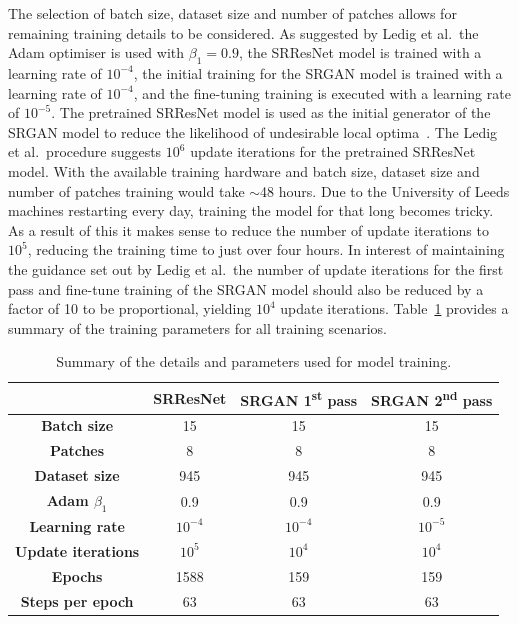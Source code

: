 The selection of batch size, dataset size and number of patches allows for remaining training details to be considered. As suggested by Ledig et al.\ the Adam optimiser is used with $\beta_1 = 0.9$, the SRResNet model is trained with a learning rate of $10^{-4}$, the initial training for the SRGAN model is trained with a learning rate of $10^{-4}$, and the fine-tuning training is executed with a learning rate of $10^{-5}$. The pretrained SRResNet model is used as the initial generator of the SRGAN model to reduce the likelihood of undesirable local optima~\cite{srgan}. The Ledig et al.\ procedure suggests $10^6$ update iterations for the pretrained SRResNet model. With the available training hardware and batch size, dataset size and number of patches training would take $\sim$48 hours. Due to the University of Leeds machines restarting every day, training the model for that long becomes tricky. As a result of this it makes sense to reduce the number of update iterations to $10^{5}$, reducing the training time to just over four hours. In interest of maintaining the guidance set out by Ledig et al.\ the number of update iterations for the first pass and fine-tune training of the SRGAN model should also be reduced by a factor of 10 to be proportional, yielding $10^4$ update iterations. Table~\ref{table:model_training} provides a summary of the training parameters for all training scenarios.
\begin{table}
    \centering
    \begin{tabular}{cccc}
        \toprule
        {} & \textbf{SRResNet} & \textbf{SRGAN 1\textsuperscript{st} pass} & \textbf{SRGAN 2\textsuperscript{nd} pass} \\
        \midrule
        \textbf{Batch size} & 15 & 15 & 15\\ 
        \textbf{Patches} & 8 & 8 & 8 \\
        \textbf{Dataset size} & 945 & 945 & 945\\
        \textbf{Adam $\beta_1$} & 0.9 & 0.9 & 0.9\\
        \textbf{Learning rate} & $10^{-4}$ & $10^{-4}$ & $10^{-5}$ \\
        \textbf{Update iterations} & $10^5$ & $10^4$ & $10^4$ \\
        \textbf{Epochs} & 1588 & 159 & 159 \\
        \textbf{Steps per epoch} & 63 & 63 & 63 \\
        \bottomrule
    \end{tabular}
    \caption{Summary of the details and parameters used for model training.}
    \label{table:model_training}
\end{table}

